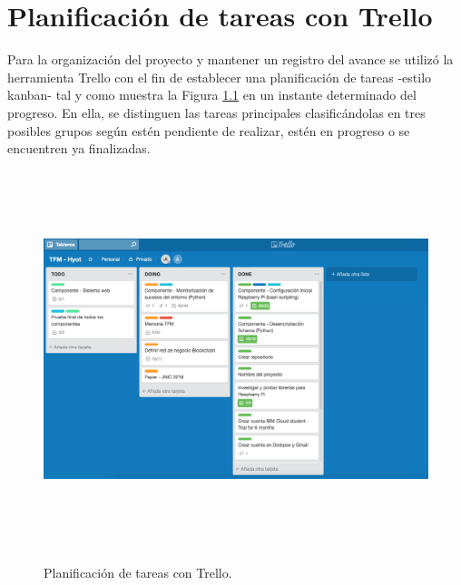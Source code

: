 \documentclass[12pt,a4paper, twoside]{report}
\makeatletter
\newcommand{\blankpage}{
				\newpage
				\thispagestyle{empty}
				\mbox{}
				\newpage
				}
\let\plainappendixpage\appendixpage
\renewcommand{\appendixpage}{%
  \begingroup
  \let\ps@plain\ps@empty
  \plainappendixpage
  \endgroup}
\makeatother
\begin{document}
	
			
	\thispagestyle{empty}
			
	\renewcommand{\appendixname}{Anexo}
	\renewcommand{\appendixtocname}{Anexos}
	\renewcommand{\appendixpagename}{ANEXOS} 
	\appendix 
	\addappheadtotoc 
	\appendixpage 
	
	\blankpage

	\chapter{Planificación de tareas con Trello}\label{trello}
	
	Para la organización del proyecto y mantener un registro del avance se utilizó la herramienta Trello con el fin de establecer una planificación de tareas -estilo \gls{kanban}- tal y como muestra la Figura \ref{fig:annexe_trello_project} en un instante determinado del progreso. En ella, se distinguen las tareas principales clasificándolas en tres posibles grupos según estén pendiente de realizar, estén en progreso o se encuentren ya finalizadas. 
	
	\begin{figure}[!ht]   
		\caption{Planificación de tareas con Trello.} 
		\begin{center} 
		 	\includegraphics[width=16cm,height=11cm]{Images/trello/trello} \\
			\label{fig:annexe_trello_project} 
		\end{center}  
	\end{figure} 
		
\end{document}
